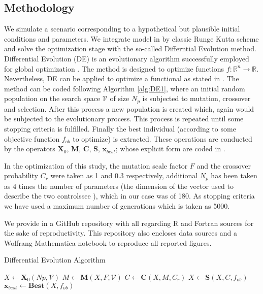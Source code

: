 \subsection{Methodology}
    We simulate a scenario corresponding to a hypothetical but plausible initial conditions and parameters. We integrate model in
 by classic Runge Kutta scheme and solve the
optimization stage with the so-called Differntial Evolution method.
Differential Evolution (DE) \cite{Storn1997} is an evolutionary
algorithm successfully employed for global optimization
\cite{Bilal2020}. The method is designed to optimize functions
$f:\mathbb{R}^n \to \mathbb{R}$. Nevertheless, DE can be applied to
optimize a functional as stated in \cite{CANTUNetAl}. The method can be
coded following Algorithm \ref{alg:DE1}, where an initial random
population on the search space $\mathcal{V}$ of size $N_p$ is subjected
to mutation, crossover and selection. After this process a new
population is created which, again would be subjected to the
evolutionary process. This process is repeated until some stopping
criteria is fulfilled. Finally the best individual (according to some
objective function $f_{ob}$ to optimize) is extracted. These operations
are conducted by the operators $\mathbf{X}_0$, $\mathbf{M}$,
$\mathbf{C}$, $\mathbf{S}$, $\mathbf{x}_{best}$;  whose explicit form
are coded in \cite{Penunuri2016}.

In the optimization of this study,
the mutation scale factor $F$ and the crossover probability $C_r$ were
taken as 1 and 0.3 respectively, additional $N_p$ has been taken as 4
times the number of parameters (the dimension of the vector used to
describe the two controls\textemdash see \cite{CANTUNetAl}), which in our case was
of 180. As stopping criteria we have used a maximum number of
generations which is taken as \num{5000}.

    We provide in \cite{gitHub_b} a GitHub repository with all regarding R
and Fortran sources for the sake of reproductivity. This repository also
encloses data sources and a Wolfrang Mathematica notebook to reproduce all
reported figures.
%
%
\begin{algorithm}[htb]
  \caption{Differential Evolution Algorithm}
  \label{alg:DE1}
  \begin{algorithmic}
    \State $X \leftarrow \mathbf{X}_0(Np,\mathcal{V})$
    \State $M \leftarrow \mathbf{M}(X,F,\mathcal{V})$
    \State $C \leftarrow \mathbf{C}(X,M,C_r)$
    \State $X \leftarrow \mathbf{S}(X,C,f_{ob})$
    \EndWhile
    \State $\mathbf{x}_{best} \leftarrow \mathbf{Best}(X, f_{ob})$
  \end{algorithmic}
\end{algorithm}
